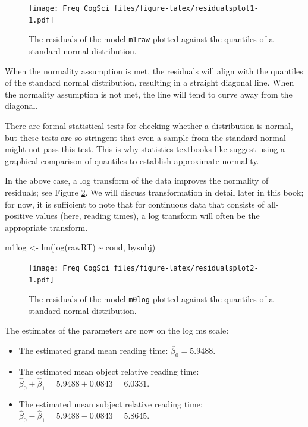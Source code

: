 \documentclass[
  12pt,
]{krantz}
\newenvironment{Shaded}{\begin{snugshade}}{\end{snugshade}}
\newcommand{\FunctionTok}[1]{\textcolor[rgb]{0.00,0.00,0.00}{#1}}
\newcommand{\NormalTok}[1]{#1}
\newcommand{\OtherTok}[1]{\textcolor[rgb]{0.56,0.35,0.01}{#1}}
\newcommand{\SpecialCharTok}[1]{\textcolor[rgb]{0.00,0.00,0.00}{#1}}
\providecommand{\tightlist}{%
  \setlength{\itemsep}{0pt}\setlength{\parskip}{0pt}}
\theoremstyle{definition}
\theoremstyle{definition}
\theoremstyle{definition}
\theoremstyle{definition}
\theoremstyle{remark}
\begin{document}
\begin{figure}
\centering
\texttt{[image: Freq\_CogSci\_files/figure-latex/residualsplot1-1.pdf]}
\caption{\label{fig:residualsplot1}The residuals of the model \texttt{m1raw} plotted against the quantiles of a standard normal distribution.}
\end{figure}

When the normality assumption is met, the residuals will align with the quantiles of the standard normal distribution, resulting in a straight diagonal line. When the normality assumption is not met, the line will tend to curve away from the diagonal.

There are formal statistical tests for checking whether a distribution is normal, but these tests are so stringent that even a sample from the standard normal might not pass this test. This is why statistics textbooks like \citet{venablesripley} suggest using a graphical comparison of quantiles to establish approximate normality.

In the above case, a log transform of the data improves the normality of residuals; see Figure \ref{fig:residualsplot2}. We will discuss transformation in detail later in this book; for now, it is sufficient to note that for continuous data that consists of all-positive values (here, reading times), a log transform will often be the appropriate transform.

\begin{Shaded}
\begin{Highlighting}[]
\NormalTok{m1log }\OtherTok{\textless{}{-}} \FunctionTok{lm}\NormalTok{(}\FunctionTok{log}\NormalTok{(rawRT) }\SpecialCharTok{\textasciitilde{}}\NormalTok{ cond, bysubj)}
\end{Highlighting}
\end{Shaded}

\begin{figure}
\centering
\texttt{[image: Freq\_CogSci\_files/figure-latex/residualsplot2-1.pdf]}
\caption{\label{fig:residualsplot2}The residuals of the model \texttt{m0log} plotted against the quantiles of a standard normal distribution.}
\end{figure}

The estimates of the parameters are now on the log ms scale:

\begin{itemize}
\tightlist
\item
  The estimated grand mean reading time: \(\hat\beta_0=5.9488\).
\item
  The estimated mean object relative reading time: \(\hat\beta_0+\hat\beta_1=5.9488+0.0843=6.0331\).
\item
  The estimated mean subject relative reading time: \(\hat\beta_0-\hat\beta_1=5.9488-0.0843=5.8645\).
\end{itemize}
\end{document}
